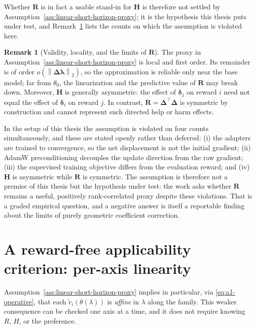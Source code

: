 \documentclass[12pt,a4paper]{report}
\newcommand{\1}{\mathbf{1}}
\newcommand{\norm}[1]{\left\lVert #1 \right\rVert}
\theoremstyle{definition}
\newtheorem{remark}[definition]{Remark}
\begin{document}
Whether \(\mathbf R\) is in fact a usable stand-in for \(\mathbf H\) is therefore not settled by Assumption~\ref{ass:linear-short-horizon-proxy}; it is the hypothesis this thesis puts under test, and Remark~\ref{rem:relationship-limits} lists the counts on which the assumption is violated here.

\begin{remark}[Validity, locality, and the limits of \(\mathbf R\)]
\label{rem:relationship-limits}
The proxy in Assumption~\ref{ass:linear-short-horizon-proxy} is local and first order. Its remainder is of order \(o(\norm{\boldsymbol{\Delta}\boldsymbol{\lambda}}_2)\), so the approximation is reliable only near the base model; far from \(\theta_0\), the linearization and the predictive value of \(\mathbf R\) may break down. Moreover, \(\mathbf H\) is generally asymmetric: the effect of \(\boldsymbol{\delta}_j\) on reward \(i\) need not equal the effect of \(\boldsymbol{\delta}_i\) on reward \(j\). In contrast, \(\mathbf R=\boldsymbol{\Delta}^{\top}\boldsymbol{\Delta}\) is symmetric by construction and cannot represent such directed help or harm effects.

In the setup of this thesis the assumption is violated on four counts simultaneously, and these are stated openly rather than deferred: (i) the adapters are trained to convergence, so the net displacement is not the initial gradient; (ii) AdamW preconditioning decouples the update direction from the raw gradient; (iii) the supervised training objective differs from the evaluation reward; and (iv) \(\mathbf H\) is asymmetric while \(\mathbf R\) is symmetric. The assumption is therefore not a premise of this thesis but the hypothesis under test: the work asks whether \(\mathbf R\) remains a useful, positively rank-correlated proxy despite these violations. That is a graded empirical question, and a negative answer is itself a reportable finding about the limits of purely geometric coefficient correction.
\end{remark}

\section{A reward-free applicability criterion: per-axis linearity}
\label{sec:linearity-criterion}

Assumption~\ref{ass:linear-short-horizon-proxy} implies in particular, via \eqref{eq:a1-operative}, that each \(\tilde r_i(\theta(\lambda))\) is \emph{affine} in \(\lambda\) along the family. This weaker consequence can be checked one axis at a time, and it does not require knowing \(R\), \(H\), or the preference.
\end{document}
